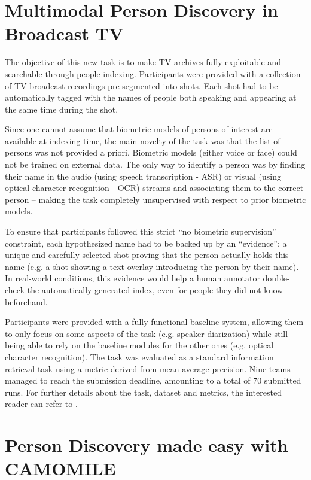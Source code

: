 \documentclass[10pt, a4paper]{article}
\begin{document}
\section{Multimodal Person Discovery in Broadcast TV}

The objective of this new task is to make TV archives fully exploitable and
searchable through people indexing. Participants were provided with a
collection of TV broadcast recordings pre-segmented into shots. Each shot had
to be automatically tagged with the names of people both speaking and appearing
at the same time during the shot.

Since one cannot assume that biometric models of persons of interest are
available at indexing time, the main novelty of the task was that the list of
persons was not provided a priori. Biometric models (either voice or face)
could not be trained on external data. The only way to identify a person was by
finding their name in the audio (using speech transcription - ASR) or visual
(using optical character recognition - OCR) streams and associating them to the
correct person -- making the task completely unsupervised with respect to prior
biometric models.

To ensure that participants followed this strict ``no biometric supervision''
constraint, each hypothesized name had to be backed up by an ``evidence'': a
unique and carefully selected shot proving that the person actually holds this
name (e.g. a shot showing a text overlay introducing the person by their name).
In real-world conditions, this evidence would help a human annotator
double-check the automatically-generated index, even for people they did not
know beforehand.

Participants were provided with a fully functional baseline system, allowing
them to only focus on some aspects of the task (e.g. speaker diarization) while
still being able to rely on the baseline modules for the other ones (e.g.
optical character recognition). The task was evaluated as a standard
information retrieval task using a metric derived from mean average precision.
Nine teams \cite{NISHI--MEDIAEVAL--2015,BUDNIK--MEDIAEVAL--2015,LOPEZ-OTERO--MEDIAEVAL--2015,INDIA--MEDIAEVAL--2015,POIGNANT--MEDIAEVAL--2015b,BENDRIS--MEDIAEVAL--2015,DOS_SANTOS--MEDIAEVAL--2015,LE--MEDIAEVAL--2015} managed to reach the submission deadline, amounting to a total of
70 submitted runs. For further details about the task, dataset and metrics, the
interested reader can refer to \cite{Poignant2015}.

\section{Person Discovery made easy with CAMOMILE}
\end{document}
